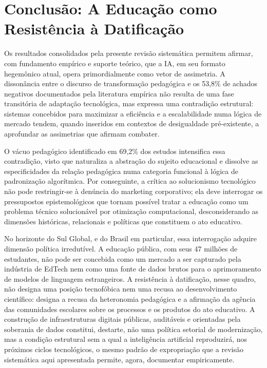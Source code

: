 \documentclass[preprint,12pt,authoryear]{elsarticle}
\begin{document}
\section{Conclusão: A Educação como Resistência à Datificação}

Os resultados consolidados pela presente revisão sistemática
permitem afirmar, com fundamento empírico e suporte teórico, que a
IA, em seu formato hegemônico atual, opera primordialmente como
vetor de assimetria. A dissonância entre o discurso de transformação
pedagógica e os 53,8\% de achados negativos documentados pela
literatura empírica não resulta de uma fase transitória de adaptação
tecnológica, mas expressa uma contradição estrutural: sistemas
concebidos para maximizar a eficiência e a escalabilidade numa
lógica de mercado tendem, quando inseridos em contextos de
desigualdade pré-existente, a aprofundar as assimetrias que afirmam
combater.

O vácuo pedagógico identificado em 69,2\% dos estudos intensifica
essa contradição, visto que naturaliza a abstração do sujeito
educacional e dissolve as especificidades da relação pedagógica numa
categoria funcional à lógica de padronização algorítmica.
Por conseguinte, a crítica ao solucionismo tecnológico não pode
restringir-se à denúncia do marketing corporativo; ela deve
interrogar os pressupostos epistemológicos que tornam possível
tratar a educação como um problema técnico solucionável por
otimização computacional, desconsiderando as dimensões históricas,
relacionais e políticas que constituem o ato educativo.

No horizonte do Sul Global, e do Brasil em particular, essa
interrogação adquire dimensão política irredutível. A educação
pública, com seus 47 milhões de estudantes, não pode ser concebida
como um mercado a ser capturado pela indústria de EdTech nem como
uma fonte de dados brutos para o aprimoramento de modelos de
linguagem estrangeiros. A resistência à datificação, nesse quadro,
não designa uma posição tecnofóbica nem uma recusa ao desenvolvimento
científico: designa a recusa da heteronomia pedagógica e a afirmação
da agência das comunidades escolares sobre os processos e os produtos
do ato educativo. A construção de infraestruturas digitais públicas,
auditáveis e orientadas pela soberania de dados constitui, destarte,
não uma política setorial de modernização, mas a condição estrutural
sem a qual a inteligência artificial reproduzirá, nos próximos ciclos
tecnológicos, o mesmo padrão de expropriação que a revisão sistemática
aqui apresentada permite, agora, documentar empiricamente.
\end{document}
